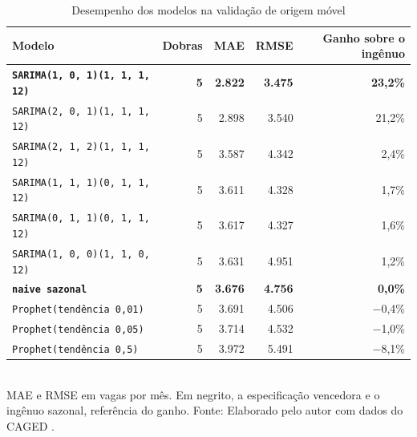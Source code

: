 \begin{table}[htbp]
    \centering
    \caption{Desempenho dos modelos na validação de origem móvel}
    \label{tab:previsao}
    \footnotesize
    \renewcommand{\arraystretch}{1.25}
    \begin{tabular}{lrrrr}
        \toprule
        \rowcolor{black!8}
        \textbf{Modelo} & \textbf{Dobras} & \textbf{MAE} & \textbf{RMSE} & \textbf{Ganho sobre o ingênuo} \\
        \midrule
        \textbf{\texttt{SARIMA(1, 0, 1)(1, 1, 1, 12)}} & \textbf{5} & \textbf{2.822} & \textbf{3.475} & \textbf{23,2\%} \\
        \texttt{SARIMA(2, 0, 1)(1, 1, 1, 12)} & 5 & 2.898 & 3.540 & 21,2\% \\
        \texttt{SARIMA(2, 1, 2)(1, 1, 1, 12)} & 5 & 3.587 & 4.342 & 2,4\% \\
        \texttt{SARIMA(1, 1, 1)(0, 1, 1, 12)} & 5 & 3.611 & 4.328 & 1,7\% \\
        \texttt{SARIMA(0, 1, 1)(0, 1, 1, 12)} & 5 & 3.617 & 4.327 & 1,6\% \\
        \texttt{SARIMA(1, 0, 0)(1, 1, 0, 12)} & 5 & 3.631 & 4.951 & 1,2\% \\
        \textbf{\texttt{naive sazonal}} & \textbf{5} & \textbf{3.676} & \textbf{4.756} & \textbf{0,0\%} \\
        \texttt{Prophet(tendência 0,01)} & 5 & 3.691 & 4.506 & $-$0,4\% \\
        \texttt{Prophet(tendência 0,05)} & 5 & 3.714 & 4.532 & $-$1,0\% \\
        \texttt{Prophet(tendência 0,5)} & 5 & 3.972 & 5.491 & $-$8,1\% \\
        \bottomrule
    \end{tabular}
    \\[4pt]
    MAE e RMSE em vagas por mês. Em negrito, a especificação vencedora e o ingênuo sazonal, referência do ganho. Fonte: Elaborado pelo autor com dados do CAGED \cite{CAGED2024}.
\end{table}
